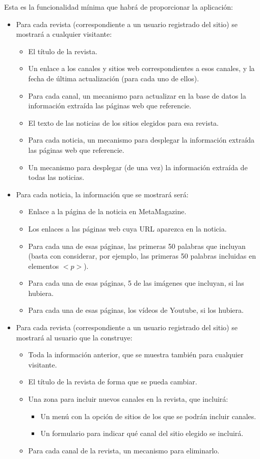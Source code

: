 Esta es la funcionalidad mínima que habrá de proporcionar la aplicación:

\begin{itemize}
\item Para cada revista (correspondiente a un usuario registrado del sitio) se mostrará a cualquier visitante:
  \begin{itemize}
  \item El título de la revista.
  \item Un enlace a los canales y sitios web correspondientes a esos canales, y la fecha de última actualización (para cada uno de ellos).
  \item Para cada canal, un mecanismo para actualizar en la base de datos la información extraída las páginas web que referencie.
  \item El texto de las noticias de los sitios elegidos para esa revista.
  \item Para cada noticia, un mecanismo para desplegar la información extraída las páginas web que referencie.
  \item Un mecanismo para desplegar (de una vez) la información extraída de todas las noticias.
  \end{itemize}

\item Para cada noticia, la información que se mostrará será:
  \begin{itemize}
  \item Enlace a la página de la noticia en MetaMagazine.
  \item Los enlaces a las páginas web cuya URL aparezca en la noticia.
  \item Para cada una de esas páginas, las primeras 50 palabras que incluyan (basta con considerar, por ejemplo, las primeras 50 palabras incluidas en elementos $<p>$).
  \item Para cada una de esas páginas, 5 de las imágenes que incluyan, si las hubiera.
  \item Para cada una de esas páginas, los vídeos de Youtube, si los hubiera.
  \end{itemize}

\item Para cada revista (correspondiente a un usuario registrado del sitio) se mostrará al usuario que la construye:

  \begin{itemize}
  \item Toda la información anterior, que se muestra también para cualquier visitante.
  \item El título de la revista de forma que se pueda cambiar.
  \item Una zona para incluir nuevos canales en la revista, que incluirá:
    \begin{itemize}
    \item Un menú con la opción de sitios de los que se podrán incluir canales.
    \item Un formulario para indicar qué canal del sitio elegido se incluirá.
    \end{itemize}
  \item Para cada canal de la revista, un mecanismo para eliminarlo.
  \end{itemize}


\end{itemize}
